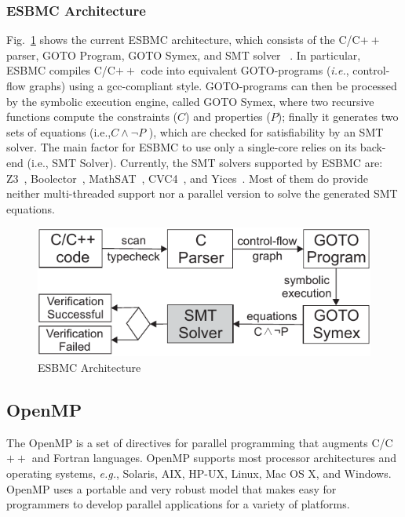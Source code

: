 \subsubsection{ESBMC Architecture}
\label{ESBMCArchitecture}

Fig.~\ref{ESBMC-Architecture} shows the current ESBMC architecture, which consists of the C/C$++$ parser, GOTO Program, GOTO Symex, and SMT solver ~\cite{Ramalho2013}. In particular, ESBMC compiles C/C$++$ code into equivalent GOTO\hyp{}programs ({\it i.e.}, control-flow graphs) using a gcc-compliant style. GOTO-programs can then be processed by the symbolic execution engine, called GOTO Symex, where two recursive functions compute the constraints ($C$) and properties ($P$); finally it generates two sets of equations (i.e.,\:$C \land \neg P$ ), which are checked for satisfiability by an SMT solver. The main factor for ESBMC to use only a single-core relies on its back-end (i.e., SMT Solver). Currently, the SMT solvers supported by ESBMC are: Z3~\cite{DeMoura2008}, Boolector~\cite{Brummayer2009}, MathSAT~\cite{Barrett2011}, CVC4~\cite{Bozzano2005}, and Yices~\cite{Dutertre2014}. Most of them do provide neither multi-threaded support nor a parallel version to solve the generated SMT equations.
%
\begin{figure}[ht]
	\centering
  \includegraphics[scale=0.9]{Image/esbmc-arch-new.pdf} 
	\caption{ESBMC Architecture}
	\label{ESBMC-Architecture}
\end{figure}

\subsection{OpenMP}
\label{OpenMP}

The OpenMP is a set of directives for parallel programming that augments C/C$++$ and Fortran languages. OpenMP supports most processor architectures and operating systems, {\it e.g.}, Solaris, AIX, HP-UX, Linux, Mac OS X, and Windows. OpenMP uses a portable and very robust model that makes easy for programmers to develop parallel applications for a variety of platforms. 

